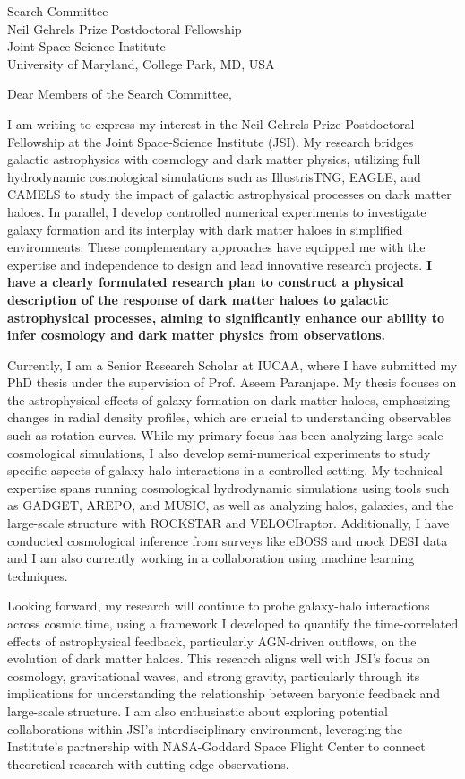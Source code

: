 \documentclass[11pt]{letter}
\begin{document}
\begin{letter}{Search Committee \\ Neil Gehrels Prize Postdoctoral Fellowship \\ Joint Space-Science Institute \\ University of Maryland, College Park, MD, USA}

\opening{Dear Members of the Search Committee,}

I am writing to express my interest in the Neil Gehrels Prize Postdoctoral Fellowship at the Joint Space-Science Institute (JSI). My research bridges galactic astrophysics with cosmology and dark matter physics, utilizing full hydrodynamic cosmological simulations such as IllustrisTNG, EAGLE, and CAMELS to study the impact of galactic astrophysical processes on dark matter haloes. In parallel, I develop controlled numerical experiments to investigate galaxy formation and its interplay with dark matter haloes in simplified environments. These complementary approaches have equipped me with the expertise and independence to design and lead innovative research projects. \textbf{I have a clearly formulated research plan to construct a physical description of the response of dark matter haloes to galactic astrophysical processes, aiming to significantly enhance our ability to infer cosmology and dark matter physics from observations.}

Currently, I am a Senior Research Scholar at IUCAA, where I have submitted my PhD thesis under the supervision of Prof. Aseem Paranjape. My thesis focuses on the astrophysical effects of galaxy formation on dark matter haloes, emphasizing changes in radial density profiles, which are crucial to understanding observables such as rotation curves. While my primary focus has been analyzing large-scale cosmological simulations, I also develop semi-numerical experiments to study specific aspects of galaxy-halo interactions in a controlled setting. My technical expertise spans running cosmological hydrodynamic simulations using tools such as GADGET, AREPO, and MUSIC, as well as analyzing halos, galaxies, and the large-scale structure with ROCKSTAR and VELOCIraptor. Additionally, I have conducted cosmological inference from surveys like eBOSS and mock DESI data and I am also currently working in a collaboration using machine learning techniques.

Looking forward, my research will continue to probe galaxy-halo interactions across cosmic time, using a framework I developed to quantify the time-correlated effects of astrophysical feedback, particularly AGN-driven outflows, on the evolution of dark matter haloes. This research aligns well with JSI's focus on cosmology, gravitational waves, and strong gravity, particularly through its implications for understanding the relationship between baryonic feedback and large-scale structure. I am also enthusiastic about exploring potential collaborations within JSI’s interdisciplinary environment, leveraging the Institute’s partnership with NASA-Goddard Space Flight Center to connect theoretical research with cutting-edge observations.


\end{letter}
\end{document}
